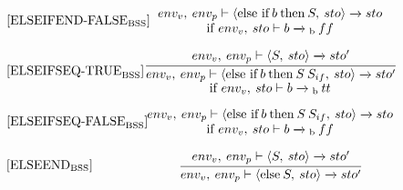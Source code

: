\begin{equation}
\begin{minipage}{.2\linewidth}
$[\text{ELSEIFEND-FALSE}_\text{BSS}]$
\end{minipage}
\begin{minipage}{.8\linewidth}
\centering
$env_v, \: env_p \vdash \langle \text{else if} \: b \: \text{then} \: S, \: sto \rangle \xrightarrow{} sto$ 
\\
if $env_v, \: sto \vdash b \xrightarrow{}\textsubscript{b} \: ff$
\end{minipage}
\end{equation}

\begin{equation}
\begin{minipage}{.2\linewidth}
$[\text{ELSEIFSEQ-TRUE}_\text{BSS}]$
\end{minipage}
\begin{minipage}{.8\linewidth}
\centering
$\cfrac{env_v, \: env_p \vdash \langle S, \: sto \rangle \xrightarrow{} sto'}{env_v, \: env_p \vdash \langle \text{else if} \: b \: \text{then} \: S \: S_{if}, \: sto \rangle \xrightarrow{} sto'}$ 
\\
if $env_v, \: sto \vdash b \xrightarrow{}\textsubscript{b} \: tt$
\end{minipage}
\end{equation}

\begin{equation}
\begin{minipage}{.2\linewidth}
$[\text{ELSEIFSEQ-FALSE}_\text{BSS}]$
\end{minipage}
\begin{minipage}{.8\linewidth}
\centering
${env_v, \: env_p \vdash \langle \text{else if} \: b \: \text{then} \: S \: S_{if}, \: sto \rangle \xrightarrow{} sto}$ 
\\
if $env_v, \: sto \vdash b \xrightarrow{}\textsubscript{b} \: ff$
\end{minipage}
\end{equation}

\begin{equation}
\begin{minipage}{.2\linewidth}
$[\text{ELSEEND}_\text{BSS}]$
\end{minipage}
\begin{minipage}{.8\linewidth}
\centering
$\cfrac{env_v, \: env_p \vdash \langle S, \: sto \rangle \xrightarrow{} sto'}{env_v, \: env_p \vdash \langle \text{else} \: S, \: sto \rangle \xrightarrow{} sto'}$ 
\end{minipage}
\end{equation}


